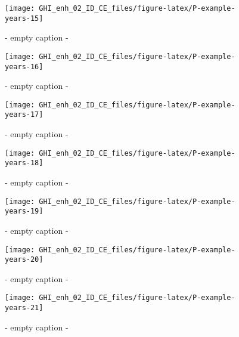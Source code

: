 \documentclass[
  10pt,
  a4paper,oneside]{article}
\begin{document}
\begin{figure}[H]

{\centering \texttt{[image: GHI\_enh\_02\_ID\_CE\_files/figure-latex/P-example-years-15]} 

}

\caption{ - empty caption - }\label{fig:P-example-years-15}
\end{figure}
\begin{figure}[H]

{\centering \texttt{[image: GHI\_enh\_02\_ID\_CE\_files/figure-latex/P-example-years-16]} 

}

\caption{ - empty caption - }\label{fig:P-example-years-16}
\end{figure}
\begin{figure}[H]

{\centering \texttt{[image: GHI\_enh\_02\_ID\_CE\_files/figure-latex/P-example-years-17]} 

}

\caption{ - empty caption - }\label{fig:P-example-years-17}
\end{figure}
\begin{figure}[H]

{\centering \texttt{[image: GHI\_enh\_02\_ID\_CE\_files/figure-latex/P-example-years-18]} 

}

\caption{ - empty caption - }\label{fig:P-example-years-18}
\end{figure}
\begin{figure}[H]

{\centering \texttt{[image: GHI\_enh\_02\_ID\_CE\_files/figure-latex/P-example-years-19]} 

}

\caption{ - empty caption - }\label{fig:P-example-years-19}
\end{figure}
\begin{figure}[H]

{\centering \texttt{[image: GHI\_enh\_02\_ID\_CE\_files/figure-latex/P-example-years-20]} 

}

\caption{ - empty caption - }\label{fig:P-example-years-20}
\end{figure}
\begin{figure}[H]

{\centering \texttt{[image: GHI\_enh\_02\_ID\_CE\_files/figure-latex/P-example-years-21]} 

}

\caption{ - empty caption - }\label{fig:P-example-years-21}
\end{figure}
\end{document}
